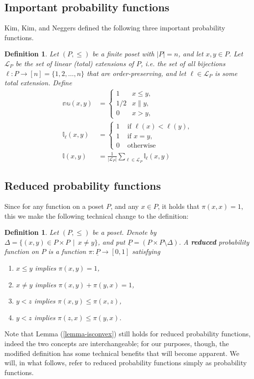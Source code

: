 \documentclass[11pt,a4paper,abstract=yes]{scrartcl}
\theoremstyle{plain}
\newtheorem{definition}[theorem]{Definition}
\newcommand{\probnull}{\mathbb{nu}}
\newcommand{\problin}[1]{\mathbb{l}_{#1}}
\newcommand{\problins}{\mathbb{l}}
\newcommand{\linexts}[1]{\mathcal{L}_{#1}}
\newcommand{\Pairs}[1]{\underline{#1}}
\newcommand{\Ppairs}{\Pairs{P}}
\begin{document}
\subsection{Important probability functions}
\label{sec:orga859451}
Kim, Kim, and Neggers  \autocite{neggers2019probfunc} defined the following three important probability functions.
\begin{definition}
Let \((P,\le)\) be a finite poset with \(|P|=n\), and let \(x,y \in P\).
Let \(\linexts{P}\) be the set of linear (total) extensions of \(P\),
i.e. the set of all bijections \(\ell: P \to [n] = \{1,2,\dots,n\}\) that are order-preserving,
and let \(\ell \in \linexts{P}\) is some total extension.
Define
\begin{align}
\label{eq-3probfuncs}
  \probnull(x,y) & =
                   \begin{cases}
                     1 & x \le y, \\
                     1/2 & x \parallel y, \\
                     0 & x > y,
                   \end{cases} \\
\problin{\ell}(x,y) &=
   \begin{cases}
     1 & \text{ if } \ell(x) < \ell(y), \\
     1 & \text{ if  } x = y, \\
     0 & \text{ otherwise}
   \end{cases} \\
\problins(x,y) & = \frac{1}{|\linexts{P}|} \sum_{\ell \in \linexts{P}} \problin{\ell}(x,y)
\end{align}
\end{definition}
\subsection{Reduced probability functions}
\label{sec:orgdf55db8}
Since for any function on a poset \(P\), and any \(x \in P\), it holds that \(\pi(x,x)=1\),
this we make the following technical change to the definition:
\begin{definition}
Let \((P, \le)\) be a poset. Denote by \(\Delta = \{(x,y) \in P \times P \, \mid \, x \neq y\}\),
and put  \(\Ppairs = (P \times P \setminus \Delta)\).
A \textbf{reduced} probability function on \(P\) is a function \(\pi: \Ppairs \to [0,1]\)
satisfying
\begin{enumerate}
\item \(x \le y\) implies \(\pi(x,y)=1\),
\item \(x \neq y\) implies \(\pi(x,y) + \pi(y,x)=1\),
\item \(y < z\) implies \(\pi(x,y) \le \pi(x,z)\),
\item \(y < z\) implies \(\pi(z,x) \le \pi(y,x)\).
\end{enumerate}
\label{def-probfunc-reduced}
\end{definition}
Note that Lemma (\ref{lemma-isconvex}) still holds for reduced probability functions, indeed the two concepts are interchangeable; for our purposes, though, the modified definition has some technical benefits that will
become apparent.
We will, in what follows, refer to reduced probability functions simply as probability functions.
\end{document}
